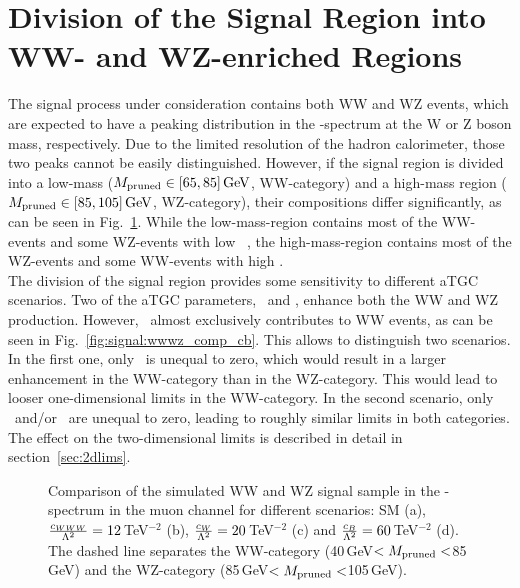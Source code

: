\section{Division of the Signal Region into WW- and WZ-enriched Regions}
\label{wwwzregs}
The signal process under consideration contains both WW and WZ events, which are expected to have a peaking distribution in the \Mpr -spectrum at the W or Z boson mass, respectively. Due to the limited resolution of the hadron calorimeter, those two peaks cannot be easily distinguished. However, if the signal region is divided into a low-mass ($M_\mathrm{pruned} \in [65,85]\,{\rm GeV}$, WW-category) and a high-mass region ($M_\mathrm{pruned} \in [85,105]\,{\rm GeV}$, WZ-category), their compositions differ significantly, as can be seen in Fig.~\ref{fig:signal:wwwz_comp}. While the low-mass-region contains most of the WW-events and some WZ-events with low \Mpr \ , the high-mass-region contains most of the WZ-events and some WW-events with high \Mpr .\\

\noindent The division of the signal region provides some sensitivity to different aTGC scenarios. Two of the aTGC parameters, \Tcwww \ and \Tccw , enhance both the WW and WZ production. However, \Tcb \ almost exclusively contributes to WW events, as can be seen in Fig.~\ref{fig:signal:wwwz_comp_cb}. This allows to distinguish two scenarios. In the first one, only \Tcb \ is unequal to zero, which would result in a larger enhancement in the WW-category than in the WZ-category. This would lead to looser one-dimensional limits in the WW-category. In the second scenario, only \Tcwww \ and/or \Tccw \ are unequal to zero, leading to roughly similar limits in both categories. The effect on the two-dimensional limits is described in detail in section~\ref{sec:2dlims}.
\begin{figure}
	\centering
	\caption[Comparison of the simulated WW and WZ signal sample in the \Mpr -spectrum in the muon channel]{Comparison of the simulated WW and WZ signal sample in the \Mpr -spectrum in the muon channel for different scenarios: SM (a), $\frac{c_{WWW}}{\Lambda^2}=12$\,TeV$^{-2}$ (b), $\frac{c_{W}}{\Lambda^2}=20$\,TeV$^{-2}$ (c) and $\frac{c_{B}}{\Lambda^2}=60$\,TeV$^{-2}$ (d). The dashed line separates the WW-category (40\,GeV$<M_\mathrm{pruned}<$85\,GeV) and the WZ-category (85\,GeV$<M_\mathrm{pruned}<$105\,GeV).}
	\label{fig:signal:wwwz_comp}
\end{figure}


